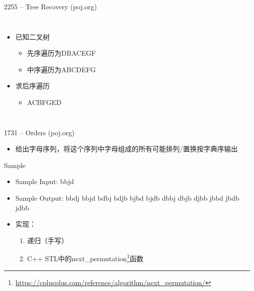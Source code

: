 \begin{frame}{2255 -- Tree Recovery (poj.org)}
    \begin{columns}
        \begin{itemize}
        \item 已知二叉树
        \begin{itemize}
            \item 先序遍历为DBACEGF
            \item 中序遍历为ABCDEFG
        \end{itemize}
        \vfill
        \item 求后序遍历
        \begin{itemize}
            \item ACBFGED
        \end{itemize}
    \end{itemize}
    \end{columns}
\end{frame}
\begin{frame}{1731 -- Orders (poj.org)}
    \begin{itemize}
        \item 给出字母序列，将这个序列中字母组成的所有可能排列/置换按字典序输出
    \end{itemize}
    \vfill
    \begin{exampleblock}{Sample}
        \begin{itemize}
            \item Sample Input: bbjd
            \item Sample Output: bbdj bbjd bdbj bdjb bjbd bjdb dbbj dbjb djbb jbbd jbdb jdbb
        \end{itemize}
    \end{exampleblock}
    \vfill
    \begin{itemize}
        \item 实现：
        \begin{enumerate}
            \item 递归（手写）
            \item C++ STL中的next\_permutation\footnote{\url{https://cplusplus.com/reference/algorithm/next_permutation/}}函数
        \end{enumerate}
    \end{itemize}
\end{frame}
